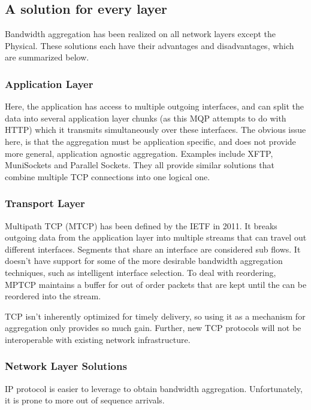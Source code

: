 \documentclass[12pt]{article}
\begin{document}
	\subsection{A solution for every layer}

		Bandwidth aggregation has been realized on all network layers except the Physical. These solutions each have their advantages and disadvantages, which are summarized below.

		\subsubsection{Application Layer}
			Here, the application has access to multiple outgoing interfaces, and can split the data into several application layer chunks (as this MQP attempts to do with HTTP) which it transmits simultaneously over these interfaces. The obvious issue here, is that the aggregation must be application specific, and does not provide more general, application agnostic aggregation. Examples include XFTP, MuniSockets and Parallel Sockets. They all provide similar solutions that combine multiple TCP connections into one logical one.

		\subsubsection{Transport Layer}
			Multipath TCP (MTCP) has been defined by the IETF in 2011. It breaks outgoing data from the application layer into multiple streams that can travel out different interfaces. Segments that share an interface are considered sub flows. It doesn't have support for some of the more desirable bandwidth aggregation techniques, such as intelligent interface selection. To deal with reordering, MPTCP maintains a buffer for out of order packets that are kept until the can be reordered into the stream. 

			TCP isn't inherently optimized for timely delivery, so using it as a mechanism for aggregation only provides so much gain. Further, new TCP protocols will not be interoperable with existing network infrastructure. 

		\subsubsection{Network Layer Solutions}

			IP protocol is easier to leverage to obtain bandwidth aggregation. Unfortunately, it is prone to more out of sequence arrivals.
\end{document}
